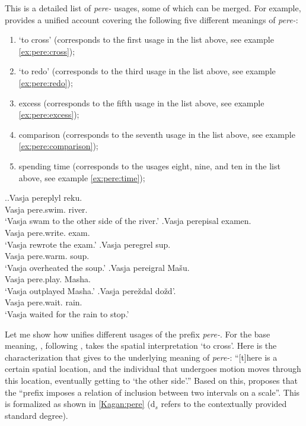 This is a detailed list of \textit{pere-} usages, some of which can be merged. For example, \citet[119--125]{Kagan:book} provides a unified account covering the following five different meanings of \textit{pere-}: 
\begin{enumerate}
\item `to cross' (corresponds to the first usage in the list above, see example \ref{ex:pere:cross});
\item `to redo' (corresponds to the third usage in the list above, see example \ref{ex:pere:redo});
\item excess (corresponds to the fifth usage in the list above, see example \ref{ex:pere:excess});
\item comparison (corresponds to the seventh usage in the list above, see example \ref{ex:pere:comparison});
\item spending time (corresponds to the usages eight, nine, and ten in the list above, see example \ref{ex:pere:time});
\end{enumerate}

\ex.\label{ex:pere}\ag.\label{ex:pere:cross}Vasja pereplyl reku.\\
Vasja pere.swim. river.\\
\trans `Vasja swam to the other side of the river.'
\bg.\label{ex:pere:redo}Vasja perepisal examen.\\
Vasja pere.write. exam.\\
\trans `Vasja rewrote the exam.'
\bg.\label{ex:pere:excess}Vasja peregrel sup.\\
Vasja pere.warm. soup.\\
\trans `Vasja overheated the soup.'
\bg.\label{ex:pere:comparison}Vasja pereigral Ma\v{s}u.\\
Vasja pere.play. Masha.\\
\trans `Vasja outplayed Masha.'
\bg.\label{ex:pere:time}Vasja pere\v{z}dal do\v{z}d'.\\
Vasja pere.wait. rain.\\
\trans `Vasja waited for the rain to stop.'

Let me show how \citet{Kagan:book} unifies different usages of the prefix \textit{pere-}. For the base meaning, \citet[120--121]{Kagan:book}, following \citet{Janda:88}, takes the spatial interpretation `to cross'. Here is the characterization that \citet[121]{Kagan:book} gives to the underlying meaning of \textit{pere-}: ``[t]here is a certain spatial location, and the individual that undergoes motion moves through this location, eventually getting to `the other side'.'' Based on this, \citet[122]{Kagan:book} proposes that the ``prefix imposes a relation of inclusion between two intervals on a scale''. This is formalized as shown in \ref{Kagan:pere} (d$_s$ refers to the contextually provided standard degree).

